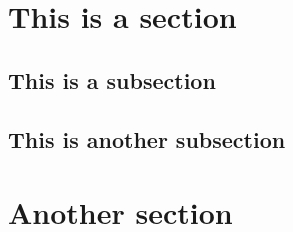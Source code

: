 \documentclass[letterpaper,12pt]{article}
\begin{document}
\tableofcontents

\section{This is a section}
\lipsum[1-3]
\subsection{This is a subsection}
\lipsum[1-3]
\subsection{This is another subsection}
\lipsum[1-3]
\section{Another section}
\lipsum[1-3]
\end{document}
